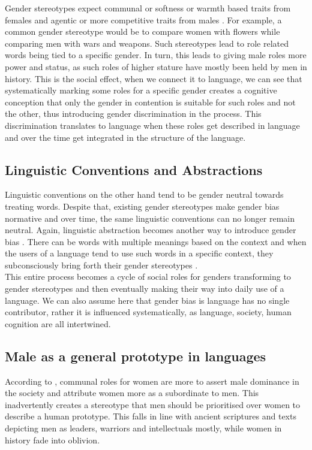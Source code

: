 \documentclass{article}
\begin{document}
\noindent
Gender stereotypes expect communal or softness or warmth based traits from females and agentic or more competitive traits from males \cite{cuddy2008warmth}. For example, a common gender stereotype would be to compare women with flowers while comparing men with wars and weapons. Such stereotypes lead to role related words being tied to a specific gender. In turn, this leads to giving male roles more power and status, as such roles of higher stature have mostly been held by men in history. This is the social effect, when we connect it to language, we can see that systematically marking some roles for a specific gender creates a cognitive conception that only the gender in contention is suitable for such roles and not the other, thus introducing gender discrimination in the process. This discrimination translates to language when these roles get described in language and over the time get integrated in the structure of the language.

\subsection*{Linguistic Conventions and Abstractions}
Linguistic conventions on the other hand tend to be gender neutral towards treating words. Despite that, existing gender stereotypes make gender bias normative and over time, the same linguistic conventions can no longer remain neutral. Again, linguistic abstraction becomes another way to introduce gender bias \cite{ng2007language}. There can be words with multiple meanings based on the context and when the users of a language tend to use such words in a specific context, they subconsciously bring forth their gender stereotypes \cite{rubini2014strategic}. \\ 

\noindent
This entire process becomes a cycle of social roles for genders transforming to gender stereotypes and then eventually making their way into daily use of a language. We can also assume here that gender bias is language has no single contributor, rather it is influenced systematically, as language, society, human cognition are all intertwined. 

\subsection*{Male as a general prototype in languages}
According to \cite{eagly1994people}, communal roles for women are more to assert male dominance in the society and attribute women more as a subordinate to men. This inadvertently creates a stereotype that men should be prioritised over women to describe a human prototype. This falls in line with ancient scriptures and texts depicting men as leaders, warriors and intellectuals mostly, while women in history fade into oblivion. \\ 
\end{document}
